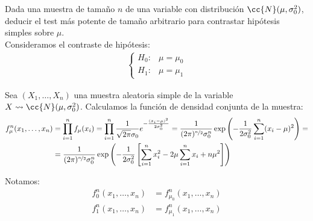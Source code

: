 \begin{ejercicio}
    Dada una muestra de tamaño $n$ de una variable con distribución $\cc{N}(\mu, \sigma_0^2)$, deducir el test más potente de tamaño arbitrario para contrastar hipótesis simples sobre $\mu$.\\

    Consideramos el contraste de hipótesis:
    \begin{align*}
        \begin{cases}
            H_0: & \mu = \mu_0 \\
            H_1: & \mu = \mu_1
        \end{cases}
    \end{align*}
    
    Sea $(X_1, \ldots, X_n)$ una muestra aleatoria simple de la variable $X\rightsquigarrow \cc{N}(\mu, \sigma_0^2)$. Calculamos la función de densidad conjunta de la muestra:
    \begin{align*}
        f_\mu^n(x_1, \ldots, x_n) &= \prod_{i=1}^{n} f_\mu(x_i) = \prod_{i=1}^{n} \frac{1}{\sqrt{2\pi}\sigma_0} e^{-\frac{(x_i-\mu)^2}{2\sigma_0^2}} = \frac{1}{(2\pi)^{\nicefrac{n}{2}}\sigma_0^n} \exp\left(-\frac{1}{2\sigma_0^2}\sum_{i=1}^{n}(x_i-\mu)^2\right)
        =\\&= \frac{1}{(2\pi)^{\nicefrac{n}{2}}\sigma_0^n} \exp\left(-\frac{1}{2\sigma_0^2}\left[\sum_{i=1}^{n}x_i^2 - 2\mu\sum_{i=1}^{n}x_i + n\mu^2\right]\right)
    \end{align*}
    
    Notamos:
    \begin{align*}
        f_0^n(x_1, \ldots, x_n) &= f_{\mu_0}^n(x_1, \ldots, x_n) \\
        f_1^n(x_1, \ldots, x_n) &= f_{\mu_1}^n(x_1, \ldots, x_n)
    \end{align*}


\end{ejercicio}
